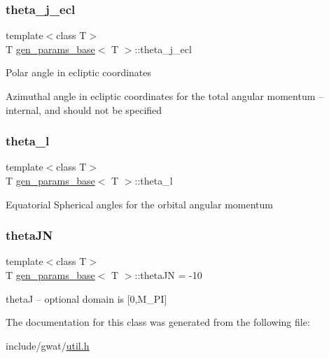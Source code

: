 \subsubsection{\texorpdfstring{theta\+\_\+j\+\_\+ecl}{theta\_j\_ecl}}
{\footnotesize\ttfamily template$<$class T$>$ \\
T \hyperlink{classgen__params__base}{gen\+\_\+params\+\_\+base}$<$ T $>$\+::theta\+\_\+j\+\_\+ecl}

Polar angle in ecliptic coordinates

Azimuthal angle in ecliptic coordinates for the total angular momentum -- internal, and should not be specified \mbox{\label{classgen__params__base_a760b7a0a51b9cd24cb63c13344e6493c}} 
\subsubsection{\texorpdfstring{theta\+\_\+l}{theta\_l}}
{\footnotesize\ttfamily template$<$class T$>$ \\
T \hyperlink{classgen__params__base}{gen\+\_\+params\+\_\+base}$<$ T $>$\+::theta\+\_\+l}

Equatorial Spherical angles for the orbital angular momentum \mbox{\label{classgen__params__base_ac855eff52f4ec75a63900f63fb8a1942}} 
\subsubsection{\texorpdfstring{theta\+JN}{thetaJN}}
{\footnotesize\ttfamily template$<$class T$>$ \\
T \hyperlink{classgen__params__base}{gen\+\_\+params\+\_\+base}$<$ T $>$\+::theta\+JN = -\/10}

thetaJ -- optional domain is \mbox{[}0,M\+\_\+\+PI\mbox{]} 

The documentation for this class was generated from the following file\+:\begin{DoxyCompactItemize}
\item 
include/gwat/\hyperlink{util_8h}{util.\+h}\end{DoxyCompactItemize}
